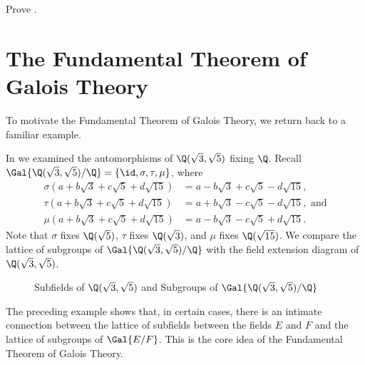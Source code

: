 \begin{exercise}\label{exercise-intermediate-field-of-galois-extension-is-galois-extension}
    Prove .
\end{exercise}

\section{The Fundamental Theorem of Galois Theory}
To motivate the Fundamental Theorem of Galois Theory, we return back to a familiar example.

\begin{example}
    In  we examined the automorphisms of $\Q(\sqrt3, \sqrt5)$ fixing $\Q$. Recall $\Gal{\Q(\sqrt3,\sqrt5)/\Q} = \{\id, \sigma, \tau, \mu\}$, where
    \begin{align*}
        \sigma(a + b\sqrt3 + c\sqrt5 + d\sqrt{15}) &= a - b\sqrt3 + c\sqrt5 - d\sqrt{15},\\
        \tau(a + b\sqrt3 + c\sqrt5 + d\sqrt{15}) &= a + b\sqrt3 - c\sqrt5 - d\sqrt{15}, \text{ and}\\
        \mu(a + b\sqrt3 + c\sqrt5 + d\sqrt{15}) &= a - b\sqrt3 - c\sqrt5 + d\sqrt{15}.
    \end{align*}
    Note that $\sigma$ fixes $\Q(\sqrt5)$, $\tau$ fixes $\Q(\sqrt3)$, and $\mu$ fixes $\Q(\sqrt{15})$. We compare the lattice of subgroups of $\Gal{\Q(\sqrt3,\sqrt5)/\Q}$ with the field extension diagram of $\Q(\sqrt3, \sqrt5)$.

    \begin{figure}[H]
        \centering
        \caption{Subfields of $\Q(\sqrt3,\sqrt5)$ and Subgroups of $\Gal{\Q(\sqrt3,\sqrt5)/\Q}$}
    \end{figure}
\end{example}

The preceding example shows that, in certain cases, there is an intimate connection between the lattice of subfields between the fields $E$ and $F$ and the lattice of subgroups of $\Gal{E/F}$. This is the core idea of the Fundamental Theorem of Galois Theory.

